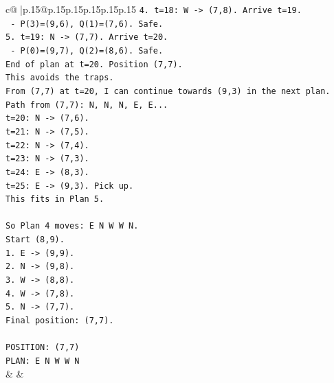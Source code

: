 \documentclass{article}
\begin{document}
{\begin{supertabular}{c@{$\;$}|p{.15\linewidth}@{}p{.15\linewidth}p{.15\linewidth}p{.15\linewidth}p{.15\linewidth}p{.15\linewidth}}
{{{\texttt{4. t=18: W {-}> (7,8). Arrive t=19.} \\
\texttt{   {-} P(3)=(9,6), Q(1)=(7,6). Safe.} \\
\texttt{5. t=19: N {-}> (7,7). Arrive t=20.} \\
\texttt{   {-} P(0)=(9,7), Q(2)=(8,6). Safe.} \\
\texttt{End of plan at t=20. Position (7,7).} \\
\texttt{This avoids the traps.} \\
\texttt{From (7,7) at t=20, I can continue towards (9,3) in the next plan.} \\
\texttt{Path from (7,7): N, N, N, E, E...} \\
\texttt{t=20: N {-}> (7,6).} \\
\texttt{t=21: N {-}> (7,5).} \\
\texttt{t=22: N {-}> (7,4).} \\
\texttt{t=23: N {-}> (7,3).} \\
\texttt{t=24: E {-}> (8,3).} \\
\texttt{t=25: E {-}> (9,3). Pick up.} \\
\texttt{This fits in Plan 5.} \\
\\ 
\texttt{So Plan 4 moves: E N W W N.} \\
\texttt{Start (8,9).} \\
\texttt{1. E {-}> (9,9).} \\
\texttt{2. N {-}> (9,8).} \\
\texttt{3. W {-}> (8,8).} \\
\texttt{4. W {-}> (7,8).} \\
\texttt{5. N {-}> (7,7).} \\
\texttt{Final position: (7,7).} \\
\\ 
\texttt{POSITION: (7,7)} \\
\texttt{PLAN: E N W W N} \\
            }
        }
    }
    & & \\ \\


\end{supertabular}}
\end{document}
